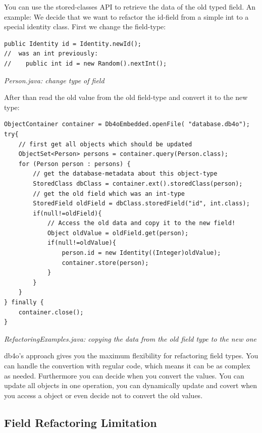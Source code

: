 You can use the stored-classes API to retrieve the data of the old typed field. An example: We decide that we want to refactor the id-field from a simple int to a special identity class. First we change the field-type:

\begin{lstlisting}
public Identity id = Identity.newId();
//  was an int previously:
//    public int id = new Random().nextInt();
\end{lstlisting}

{\small\itshape Person.java: change type of field\par}
\medskip

After than read the old value from the old field-type and convert it to the new type:

\begin{lstlisting}
ObjectContainer container = Db4oEmbedded.openFile( "database.db4o");
try{
    // first get all objects which should be updated
    ObjectSet<Person> persons = container.query(Person.class);
    for (Person person : persons) {
        // get the database-metadata about this object-type
        StoredClass dbClass = container.ext().storedClass(person);
        // get the old field which was an int-type
        StoredField oldField = dbClass.storedField("id", int.class);
        if(null!=oldField){
            // Access the old data and copy it to the new field!
            Object oldValue = oldField.get(person);
            if(null!=oldValue){
                person.id = new Identity((Integer)oldValue);
                container.store(person);
            }                   
        }
    }
} finally {
    container.close();
}
\end{lstlisting}

{\small\itshape RefactoringExamples.java: copying the data from the old field type to the new one\par}
\medskip

db4o's approach gives you the maximum flexibility for refactoring field types. You can handle the convertion with regular code, which means it can be as complex as needed. Furthermore you can decide when you convert the values. You can update all objects in one operation, you can dynamically update and covert when you access a object or even decide not to convert the old values.

\subsection{Field Refactoring Limitation}
\label{ref:advanced-topics-refactoring-and-schema-evolution-field-refactoring-limitation}

